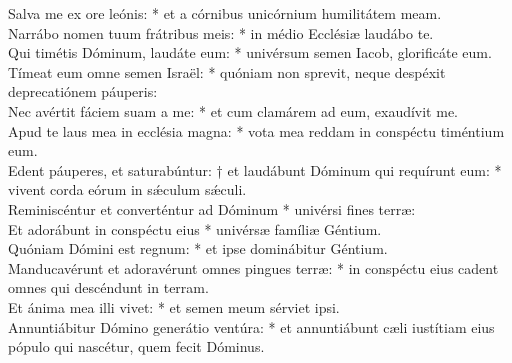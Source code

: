 {	Salva me ex ore leónis: * et a córnibus unicórnium humilitátem meam. \\
	Narrábo nomen tuum frátribus meis: * in médio Ecclésiæ laudábo te. \\
	Qui timétis Dóminum, laudáte eum: * univérsum semen Iacob, glorificáte eum. \\
	Tímeat eum omne semen Israël: * quóniam non sprevit, neque despéxit deprecatiónem páuperis: \\
	Nec avértit fáciem suam a me: * et cum clamárem ad eum, exaudívit me. \\
	Apud te laus mea in ecclésia magna: * vota mea reddam in conspéctu timéntium eum. \\
	Edent páuperes, et saturabúntur: † et laudábunt Dóminum qui requírunt eum: * vivent corda eórum in sǽculum sǽculi. \\
	Reminiscéntur et converténtur ad Dóminum * univérsi fines terræ: \\
	Et adorábunt in conspéctu eius * univérsæ famíliæ Géntium. \\
	Quóniam Dómini est regnum: * et ipse dominábitur Géntium. \\
	Manducavérunt et adoravérunt omnes pingues terræ: * in conspéctu eius cadent omnes qui descéndunt in terram. \\
	Et ánima mea illi vivet: * et semen meum sérviet ipsi. \\
	Annuntiábitur Dómino generátio ventúra: * et annuntiábunt cæli iustítiam eius pópulo qui nascétur, quem fecit Dóminus. \\
}


